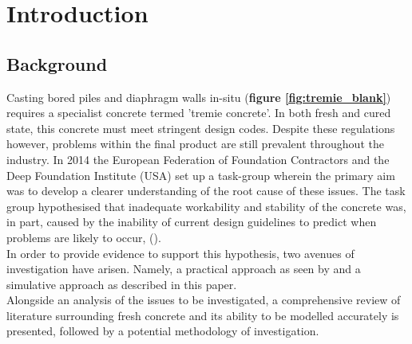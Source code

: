 
\chapter{Introduction}  %

\ifpdf
    \graphicspath{{Chapter1/Figs/Raster/}{Chapter1/Figs/PDF/}{Chapter1/Figs/}}
\else
    \graphicspath{{Chapter1/Figs/Vector/}{Chapter1/Figs/}}
\fi

\newcommand{\citetex}[1]{\citeauthor{#1} (\citeyear{#1})}
\newcommand{\citebrac}[1]{(\citeauthor{#1}, \citeyear{#1})}

\section{Background}

Casting bored piles and diaphragm walls in-situ ({\bfseries figure \ref{fig:tremie_blank}}) requires a specialist concrete termed 'tremie concrete'. In both fresh and cured state, this concrete must meet stringent design codes. Despite these regulations however, problems within the final product are still prevalent throughout the industry. In 2014 the European Federation of Foundation Contractors and the Deep Foundation Institute (USA) set up a task-group wherein the primary aim was to develop a clearer understanding of the root cause of these issues. The task group hypothesised that inadequate workability and stability of the concrete was, in part, caused by the inability of current design guidelines to predict when problems are likely to occur, \citetex{EFFC}.\\

\noindent
In order to provide evidence to support this hypothesis, two avenues of investigation have arisen. Namely, a practical approach as seen by \citet{bjorn}  and a simulative approach as described in this paper.\\

\noindent
Alongside an analysis of the issues to be investigated, a comprehensive review of literature surrounding fresh concrete and its ability to be modelled accurately is presented, followed by a potential methodology of investigation. 

